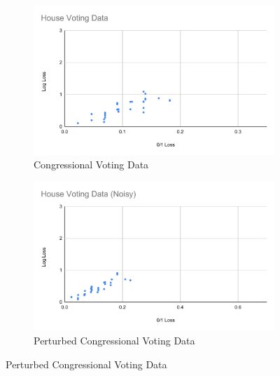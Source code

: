 \documentclass[twoside,11pt]{article}
\begin{document}
\begin{figure}[h!]
  \centering
  \begin{subfigure}[b]{0.45\linewidth}
    \includegraphics[width=\linewidth]{images/vote.pdf}
    \caption{Congressional Voting Data}
  \end{subfigure}
  \begin{subfigure}[b]{0.45\linewidth}
    \includegraphics[width=\linewidth]{images/vote(noise).pdf}
    \caption{Perturbed Congressional Voting Data}
  \end{subfigure}
  

\end{figure}
\end{document}
